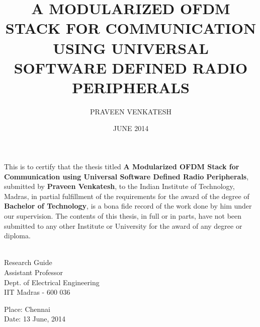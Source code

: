 \documentclass[BTech]{iitmdiss}
\begin{document}

\title{A MODULARIZED OFDM STACK FOR COMMUNICATION USING UNIVERSAL SOFTWARE
       DEFINED RADIO PERIPHERALS}

\author{PRAVEEN VENKATESH}

\date{JUNE 2014}

\maketitle


\certificate

\vspace*{0.5in}

\noindent This is to certify that the thesis titled {\bf A Modularized OFDM
Stack for Communication using Universal Software Defined Radio Peripherals},
submitted by {\bf Praveen Venkatesh}, to the Indian Institute of Technology,
Madras, in partial fulfillment of the requirements for the award of the degree
of {\bf Bachelor of Technology}, is a bona fide record of the work done by him
under our supervision. The contents of this thesis, in full or in parts, have
not been submitted to any other Institute or University for the award of any
degree or diploma.

\vspace*{1.5in}

\begin{singlespacing}
\hspace*{-0.25in}
\parbox{2.5in}{
	 \\
	\noindent Research Guide \\
	\noindent Assistant Professor \\
	\noindent Dept. of Electrical Engineering\\
	\noindent IIT Madras - 600 036 \\
}
\hspace*{1.0in}
\end{singlespacing}

\vspace*{0.25in}

\noindent Place: Chennai \\
Date: 13 June, 2014

\end{document}
